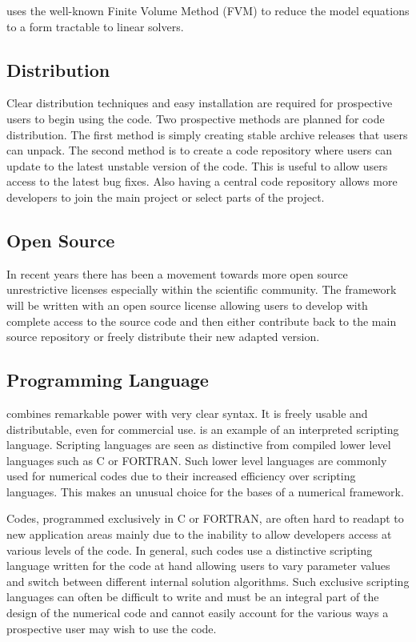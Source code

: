 \FiPy{} uses the well-known Finite Volume Method (FVM) to reduce the
model equations to a form tractable to linear solvers.

\subsection{Distribution}

Clear distribution techniques and easy installation are required for
prospective users to begin using the code. Two prospective methods are
planned for code distribution. The first method is simply creating
stable archive releases that users can unpack. The second method is to
create a code repository where users can update to the latest unstable
version of the code. This is useful to allow users access to the
latest bug fixes. Also having a central code repository allows more
developers to join the main project or select parts of the project.

\subsection{Open Source}

In recent years there has been a movement towards more open source
unrestrictive licenses especially within the scientific community. The
\FiPy{} framework will be written with an open source license allowing
users to develop with complete access to the source code and then
either contribute back to the main source repository or freely
distribute their new adapted version. 

\subsection{\Python{} Programming Language}

\Python{} combines remarkable power with very clear syntax. It is
freely usable and distributable, even for commercial use. \Python{} is
an example of an interpreted scripting language. Scripting languages
are seen as distinctive from compiled lower level languages such as C
or FORTRAN. Such lower level languages are commonly used for numerical
codes due to their increased efficiency over scripting languages. This
makes \Python{} an unusual choice for the bases of a numerical
framework.

Codes, programmed exclusively in C or FORTRAN, are often hard to
readapt to new application areas mainly due to the inability to allow
developers access at various levels of the code. In general, such
codes use a distinctive scripting language written for the code at
hand allowing users to vary parameter values and switch between
different internal solution algorithms. Such exclusive scripting
languages can often be difficult to write and must be an integral part
of the design of the numerical code and cannot easily account for the
various ways a prospective user may wish to use the code.

